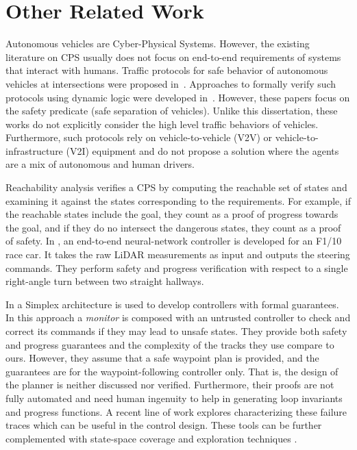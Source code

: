 \section{Other Related Work}
Autonomous vehicles are Cyber-Physical Systems.
%
However, the existing literature on CPS usually does not focus on end-to-end requirements of systems that interact with humans.
%
Traffic protocols for safe behavior of autonomous vehicles at intersections
were proposed in~\cite{azimi2011vehicular,hafner2013cooperative}.
%
Approaches to formally verify such protocols using dynamic logic were developed in~\cite{loos2011safe}.
%
However, these papers focus on the safety predicate (safe separation of vehicles).
%
Unlike this dissertation,
these works do not explicitly consider the high level traffic behaviors of vehicles.
%
Furthermore, such protocols rely on vehicle-to-vehicle (V2V) or vehicle-to-infrastructure (V2I) equipment and do not propose a solution where the agents are a mix of autonomous and human drivers.


Reachability analysis verifies a CPS by computing the reachable set of states and examining it against the states corresponding to the requirements.
%
For example, if the reachable states include the goal, they count as a proof of progress towards the goal, and if they do no intersect the dangerous states, they count as a proof of safety.
%
In \cite{Ivanov.2020,Ivanov-verifying.2020}, an end-to-end neural-network controller is developed for an F1/10 race car.
%
It takes the raw LiDAR measurements as input and outputs the steering commands.
%
They perform safety and progress verification with respect to a single right-angle turn between two straight hallways.



In \cite{Bohrer.2019} a Simplex architecture \cite{Seto.1998} is used to develop controllers with formal guarantees.
%
In this approach a \emph{monitor} is composed with an untrusted controller to check and correct its commands if they may lead to unsafe states.
%
They provide both safety and progress guarantees and the complexity of the tracks they use compare to ours.
%
However, they assume that a safe waypoint plan is provided, and the guarantees are for the waypoint-following controller only.
%
That is, the design of the planner is neither discussed nor verified.
%
Furthermore, their proofs are not fully automated and need human ingenuity to help in generating loop invariants and progress functions.
%
A recent line of work \cite{DBLP:conf/amcc/0002BD20,DBLP:conf/adhs/GoyalD18,DBLP:journals/automatica/GoyalD20,DBLP:journals/corr/abs-2311-15343}  explores characterizing these failure traces which can be useful in the control design.
%
These tools can be further complemented with state-space coverage and exploration techniques \cite{DBLP:journals/tcad/GoyalDD22,DBLP:conf/atva/0002D20,DBLP:phd/basesearch/Goyal22}.